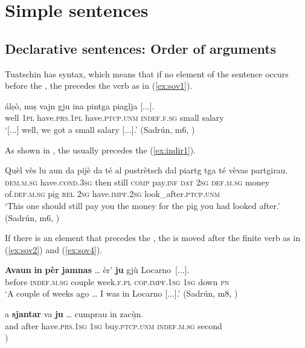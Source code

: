 \chapter{Simple sentences}

\section{Declarative sentences: Order of arguments}\label{sec:5.1}

Tuatschin has  syntax, which means that if no element of the sentence occurs before the , the  precedes the verb as in (\ref{ex:sov1}).

\ea
\label{ex:sov1}
	\gll    [...] álṣò, {\ob}nuṣ{\cb} {\ob}vajn gju{\cb} {\ob}ina pintga piaglja{\cb} [...].\\
 {} well \textsc{1pl} have.\textsc{prs.1pl}  have.\textsc{ptcp.unm} \textsc{indef.f.sg} small salary \\
\glt `[...] well, we got a small salary [...].' (Sadrún, m6, )
\z

As shown in , the  usually precedes the  (\ref{ex:indir1}).

\ea
\label{ex:indir1}
\gll    Quèl vès lu aun da pijè {\ob}da té{\cb} {\ob}al pustrètsch dal piartg tga té vèvas partgirau{\cb}. \\
\textsc{dem.m.sg} have.\textsc{cond.3sg} then still \textsc{comp} pay.\textsc{inf} \textsc{dat} \textsc{2sg} \textsc{def.m.sg} money of.\textsc{def.m.sg} pig \textsc{rel} \textsc{2sg} have.\textsc{impf.2sg} look\_after.\textsc{ptcp.unm}\\
\glt `This one should still pay you the money for the pig you had looked after.' (Sadrún, m6, )
\z

If there is an element that precedes the , the  is moved after the finite verb as in (\ref{ex:sov2}) and (\ref{ex:sov4}).

\ea
\label{ex:sov2}
\gll {\ob}\textbf{Avaun} \textbf{in} \textbf{pèr} \textbf{jamnas}{\cb} … èr’ {\ob}\textbf{ju}{\cb} gjù Locarno~[...].\\
before \textsc{indef.m.sg} couple week.\textsc{f.pl} {} \textsc{cop.impf.1sg} \textsc{1sg} down \textsc{pn}\\
\glt `A couple of weeks ago … I was in Locarno [...].' (Sadrún, m8, )
\z

\ea
\label{ex:sov4}
\gll  [...] a {\ob}\textbf{sjantar}{\cb} va {\ob}{\textbf{ju}}{\cb} … cumprau in zacù̱n.\\
{} and after  have.\textsc{prs.1sg} \textsc{1sg} {} buy.\textsc{ptcp.unm}  \textsc{indef.m.sg} second\\
\glt {})
\z



